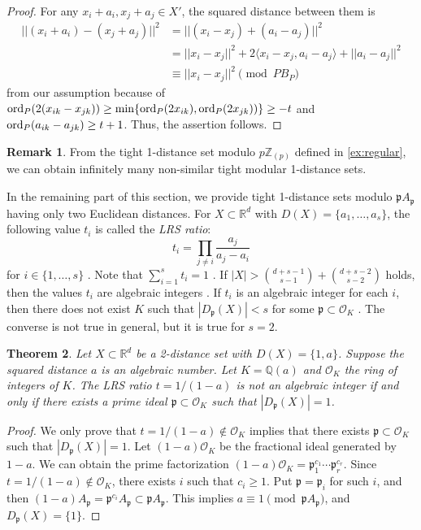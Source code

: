 \documentclass[a4paper, 11pt]{article}
\newcommand{\R}{\mathbb{R}}
\newcommand{\Q}{\mathbb{Q}}
\newcommand{\p}{\mathfrak{p}}
\newcommand{\Oc}{\mathcal{O}}
\newtheorem{theorem}{Theorem}[section]
\theoremstyle{definition}
\newtheorem{remark}[theorem]{Remark}
\begin{document}
\begin{proof}
For any $x_i+a_i,x_j+a_j \in X'$, the squared distance between them is 
\begin{align*}
||(x_i+a_i)-(x_j+a_j)||^2&=||(x_i-x_j)+(a_i-a_j)||^2\\
&=||x_i-x_j||^2+2\langle x_i-x_j,a_i-a_j \rangle+||a_i-a_j||^2\\
&\equiv ||x_i-x_j||^2 \pmod{PB_P}
\end{align*}
from our assumption because of ${\rm ord}_{P}(2 (x_{ik}-x_{jk}))\geq \min\{ {\rm ord}_{P}(2x_{ik}),{\rm ord}_P (2x_{jk}))\} \geq -t$ and ${\rm ord}_{P}(a_{ik}-a_{jk})\geq t+1$. Thus, the assertion follows. 
\end{proof}
\begin{remark}
From the tight 1-distance set modulo $p \mathbb{Z}_{(p)}$ defined in \eqref{ex:regular},  
 we can obtain infinitely many non-similar tight modular 1-distance sets.
\end{remark}

In the remaining part of this section, we provide tight 1-distance sets modulo $\p A_\p$ having only two Euclidean distances. 
For $X\subset \R^d$ with $D(X)=\{ a_1,\ldots, a_s \}$, the following value $t_i$ is called the {\it LRS ratio}: 
\[
t_i=\prod_{j\ne i} \frac{a_j}{a_j-a_i}  
\]
for $i\in \{1,\ldots, s\}$ \cite{LRS77,N11}. Note that $\sum_{i=1}^s t_i=1$ \cite{MN11}. 
If $|X|> \binom{d+s-1}{s-1}+\binom{d+s-2}{s-2}$ holds, 
then the values $t_i$ are algebraic integers \cite[Corollary 4.2]{NX}.   
If $t_i$ is an algebraic integer for each $i$, then there does not exist $K$ such that  
$|D_\p(X)|<s$ for some $\p \subset \Oc_K$ \cite[Equation (4.1)]{NX}. The converse is not true in general, but it is true for $s=2$. 



\begin{theorem} \label{thm:2-dis}
Let $X\subset \R^d$ be a 2-distance set with $D(X)=\{1,a \}$. Suppose the squared distance $a$ is an algebraic number. Let $K=\Q(a)$ and $\Oc_K$ the ring of integers of $K$. 
The LRS ratio $t=1/(1-a)$ is not an algebraic integer if and only if there exists a prime ideal $\p \subset \Oc_K$ such that $|D_\p(X)|=1$. 
\end{theorem}
\begin{proof}
We only prove that $t=1/(1-a) \not \in \Oc_K$ implies that there exists $\p \subset \Oc_K$ such that $|D_\p(X)|=1$. 
Let $(1-a)\Oc_K$ be the fractional ideal generated by $1-a$. We can obtain the prime factorization  $(1-a)\Oc_K=\p_1^{c_1}\cdots \p_r^{c_r}$. 
Since $t=1/(1-a) \not \in \Oc_K$, there exists $i$ such that $c_i \geq 1$. Put $\p=\p_i$ for such $i$, and then
$(1-a)A_\p=\p^{c_i} A_\p\subset \p A_\p$. 
This implies 
$a\equiv 1 \pmod{\p A_\p}$, and $D_\p(X)=\{1\}$.
\end{proof}
\end{document}
